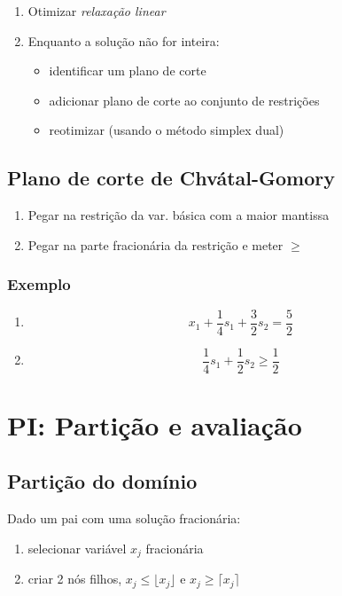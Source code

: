 \documentclass[10pt, a4paper]{article}
\begin{document}
\begin{multicols}{2}
\begin{enumerate}
    \item Otimizar \textit{relaxação linear}
    \item Enquanto a solução não for inteira:
    \begin{itemize}
        \item identificar um plano de corte
        \item adicionar plano de corte ao conjunto de restrições
        \item reotimizar (usando o método simplex dual)
    \end{itemize}
\end{enumerate}

\subsection{Plano de corte de Chvátal-Gomory}

\begin{enumerate}
    \item Pegar na restrição da var. básica com a maior mantissa
    \item Pegar na parte fracionária da restrição e meter \(\ge\)
\end{enumerate}

\subsubsection{Exemplo}

\begin{enumerate}
    \item \[ x_1 + \frac{1}{4}s_1 + \frac{3}{2} s_2 = \frac{5}{2} \]
    \item \[ \frac{1}{4}s_1 + \frac{1}{2} s_2 \ge \frac{1}{2} \]
\end{enumerate}



\section{PI: Partição e avaliação}

\subsection{Partição do domínio}

Dado um pai com uma solução fracionária:
\begin{enumerate}
    \item selecionar variável \(x_j\) fracionária
    \item criar 2 nós filhos, \(x_j \le \lfloor x_j \rfloor\) e \(x_j \ge \lceil x_j \rceil \)
\end{enumerate}


\end{multicols}
\end{document}
